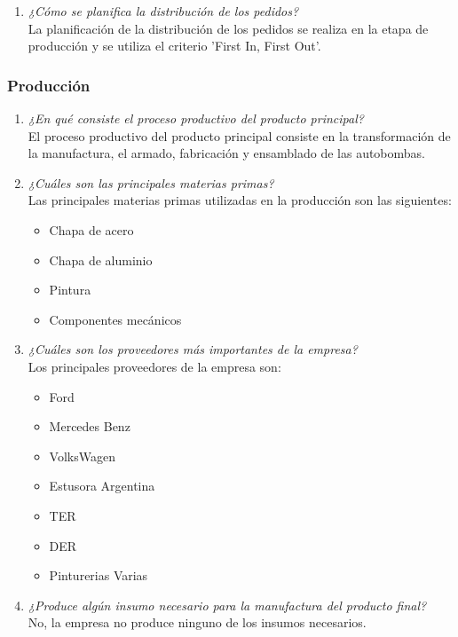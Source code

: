 \documentclass[a4paper,10pt]{article}
\begin{document}
\begin{enumerate}[resume]
				\item \textit{¿Cómo se planifica la distribución de los pedidos?}\\	
				La planificación de la distribución de los pedidos se realiza en la etapa de producción y se utiliza el criterio 'First In, First Out'.
				
			\end{enumerate}
			
\subsubsection{Producción}
			\begin{enumerate}[resume]
				\item \textit{¿En qué consiste el proceso productivo del producto principal?}\\	
				El proceso productivo del producto principal consiste en la transformación de la manufactura, el armado, fabricación y ensamblado de las autobombas.
				
				
				\item \textit{¿Cuáles son las principales materias primas?}\\	
				Las principales materias primas utilizadas en la producción son las siguientes:
				\begin{itemize}
					\item Chapa de acero
					\item Chapa de aluminio
					\item Pintura
					\item Componentes mecánicos
				\end{itemize}
				
				\item \textit{¿Cuáles son los proveedores más importantes de la empresa?}\\	
				Los principales proveedores de la empresa son:
				\begin{itemize}
					\item Ford
					\item Mercedes Benz
					\item VolksWagen
					\item Estusora Argentina
					\item TER
					\item DER
					\item Pinturerias Varias
				\end{itemize}
				
				\item \textit{¿Produce algún insumo necesario para la manufactura del producto final?}\\	
				No, la empresa no produce ninguno de los insumos necesarios.
				

\end{enumerate}
\end{document}
